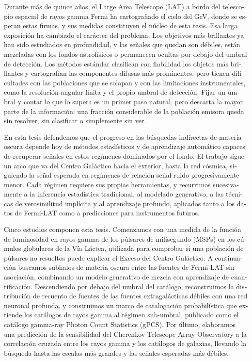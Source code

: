 \begin{otherlanguage}{spanish}
Durante más de quince años, el Large Area Telescope (LAT) a bordo del telescopio espacial de rayos gamma Fermi ha cartografiado el cielo del GeV, donde se esperan estas firmas, y sus medidas constituyen el núcleo de esta tesis. Esa larga exposición ha cambiado el carácter del problema. Los objetivos más brillantes ya han sido estudiados en profundidad, y las señales que quedan son débiles, están mezcladas con los fondos astrofísicos o permanecen ocultas por debajo del umbral de detección. Los métodos estándar clasifican con fiabilidad los objetos más brillantes y cartografían las componentes difusas más prominentes, pero tienen dificultades con las poblaciones que se solapan y con las limitaciones instrumentales, como la resolución angular finita y el propio umbral de detección. Fijar un umbral y contar lo que lo supera es un primer paso natural, pero descarta la mayor parte de la información: una fracción considerable de la población emisora queda sin resolver, sin clasificar o simplemente sin ver.

En esta tesis defendemos que el progreso en las búsquedas indirectas de materia oscura depende hoy de métodos estadísticos y de aprendizaje automático capaces de recuperar señales en estos regímenes dominados por el fondo. El trabajo sigue un arco que va del Centro Galáctico hacia el exterior, hasta la red cósmica, siguiendo la señal esperada en regímenes de relación señal-ruido progresivamente menor. Cada régimen requiere sus propias herramientas, y recurrimos sucesivamente a la inferencia estadística tradicional, al modelado generativo, a las técnicas de verosimilitud implícita y al aprendizaje profundo, aplicados tanto a los datos de Fermi-LAT como a predicciones para instrumentos futuros.

Cinco estudios componen esta tesis. Comenzamos con una medida de la función de luminosidad en rayos gamma de los púlsares de milisegundo (MSPs) en los cúmulos globulares de la Vía Láctea, utilizada para comprobar si una población de púlsares no resueltos puede explicar el Exceso del Centro Galáctico. A continuación buscamos subhalos de materia oscura entre las fuentes de Fermi-LAT sin asociación, combinando un modelo generativo de mezcla con aprendizaje de cuantificación. Descendiendo por debajo del umbral del catálogo, reconstruimos la distribución de recuento de fuentes de las fuentes extragalácticas débiles con una red neuronal profunda, y construimos un marco de catalogación probabilística que extiende los catálogos de rayos gamma al régimen sub-umbral, publicado como el catálogo gamma-ray Photon Count Statistics (gPCS). Por último, elaboramos una predicción de la sensibilidad del Cherenkov Telescope Array Observatory a la correlación cruzada entre los rayos gamma y los catálogos de galaxias, llevando la búsqueda hasta las escalas más grandes y las señales esperadas más débiles.


\end{otherlanguage}
